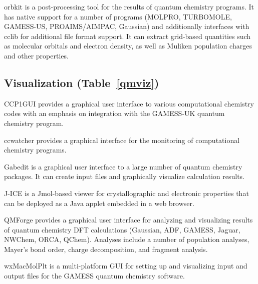 orbkit \cite{hermann2016orbkit} is a post-processing tool for the results of quantum chemistry programs.  It has native support for a number of programs (MOLPRO, TURBOMOLE, GAMESS-US, PROAIMS/AIMPAC, Gaussian) and additionally interfaces with cclib for additional file format support.  It can extract grid-based quantities such as molecular orbitals and electron density, as well as Muliken population charges and other properties.


\subsection*{Visualization (Table~\ref{qmviz})}
CCP1GUI provides a graphical user interface to various computational chemistry codes with an emphasis on integration with the GAMESS-UK quantum chemistry program.

ccwatcher provides a graphical interface for the monitoring of computational chemistry programs.

Gabedit \cite{Allouche_2010} is a graphical user interface to a large number of quantum chemistry packages. It can create input files and graphically visualize calculation results.

J-ICE \cite{Canepa_2010} is a Jmol-based viewer for crystallographic and electronic properties that can be deployed as a Java applet embedded in a web browser.
 
QMForge provides a graphical user interface for analyzing and visualizing results of quantum chemistry DFT calculations (Gaussian, ADF, GAMESS, Jaguar, NWChem, ORCA, QChem).  Analyses include a number of population analyses, Mayer's bond order, charge decomposition, and fragment analysis.

wxMacMolPlt \cite{Bode_1998} is a multi-platform GUI for setting up and visualizing input and output files for the GAMESS quantum chemistry software.